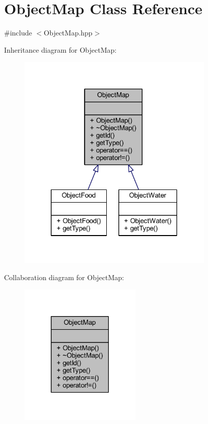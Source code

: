 \hypertarget{class_object_map}{}\section{Object\+Map Class Reference}
\label{class_object_map}


{\ttfamily \#include $<$Object\+Map.\+hpp$>$}



Inheritance diagram for Object\+Map\+:\nopagebreak
\begin{figure}[H]
\begin{center}
\leavevmode
\includegraphics[width=266pt]{class_object_map__inherit__graph}
\end{center}
\end{figure}


Collaboration diagram for Object\+Map\+:\nopagebreak
\begin{figure}[H]
\begin{center}
\leavevmode
\includegraphics[width=165pt]{class_object_map__coll__graph}
\end{center}
\end{figure}
